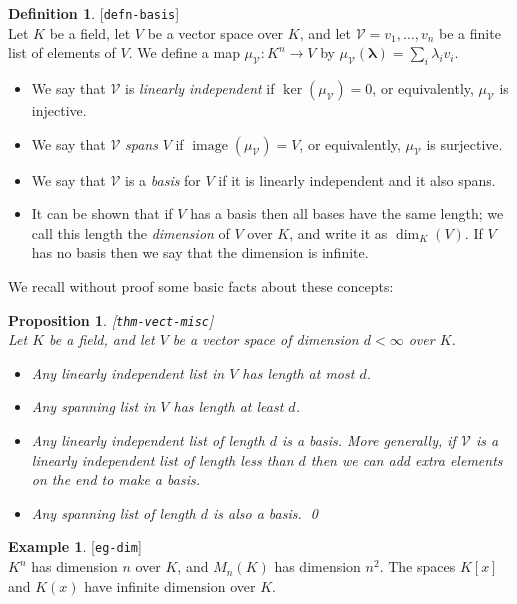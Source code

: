 \documentclass{amsart}
\newcommand{\lbl}[1]{\label{#1}\textup{[\texttt{#1}]}\ \\}
\newcommand{\lbl}{\label}
\newcommand{\img}       {\operatorname{image}}
\newcommand{\lm}        {\lambda}
\newcommand{\CV}        {{\mathcal{V}}}
\newcommand{\blm}	{\mathbf{\lambda}}
\renewcommand{\:}{\colon}
\newtheorem{proposition}[theorem]{Proposition}
\theoremstyle{definition}
\newtheorem{definition}[theorem]{Definition}
\newtheorem{example}[theorem]{Example}
\begin{document}
\begin{definition}\lbl{defn-basis}
 Let $K$ be a field, let $V$ be a vector space over $K$, and let
 $\CV=v_1,\dotsc,v_n$ be a finite list of elements of $V$.  We define
 a map $\mu_{\CV}\:K^n\to V$ by $\mu_{\CV}(\blm)=\sum_i\lm_iv_i$.
 \begin{itemize}
  \item We say that $\CV$ is \emph{linearly independent} if
   $\ker(\mu_{\CV})=0$, or equivalently, $\mu_{\CV}$ is injective.
  \item We say that $\CV$ \emph{spans} $V$ if
   $\img(\mu_{\CV})=V$, or equivalently, $\mu_{\CV}$ is surjective.
  \item We say that $\CV$ is a \emph{basis} for $V$ if it is linearly
   independent and it also spans.
  \item It can be shown that if $V$ has a basis then all bases have
   the same length; we call this length the \emph{dimension} of $V$
   over $K$, and write it as $\dim_K(V)$.  If $V$ has no basis then we
   say that the dimension is infinite.
 \end{itemize}
\end{definition}

We recall without proof some basic facts about these concepts:

\begin{proposition}\lbl{thm-vect-misc}
 Let $K$ be a field, and let $V$ be a vector space of dimension
 $d<\infty$ over $K$.  
 \begin{itemize}
  \item[(a)] Any linearly independent list in $V$ has length at most
   $d$.  
  \item[(b)] Any spanning list in $V$ has length at least $d$.
  \item[(c)] Any linearly independent list of length $d$ is a basis.
   More generally, if $\CV$ is a linearly independent list of length
   less than $d$ then we can add extra elements on the end to make a
   basis. 
  \item[(d)] Any spanning list of length $d$ is also a basis. \qed
 \end{itemize}
\end{proposition}

\begin{example}\lbl{eg-dim}
 $K^n$ has dimension $n$ over $K$, and $M_n(K)$ has dimension $n^2$.
 The spaces $K[x]$ and $K(x)$ have infinite dimension over $K$.
\end{example}
\end{document}
